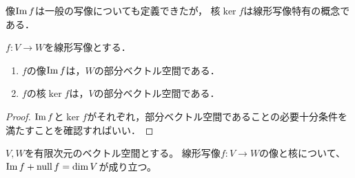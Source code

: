 \documentclass[../sotsu.tex]{subfiles}
\begin{document}
像$\operatorname{Im} f$は一般の写像についても定義できたが，
核$\ker f$は線形写像特有の概念である．



\begin{proposition}
    $f \colon V \to W$を線形写像とする．
    \begin{enumerate}
        \item $f$の像$\operatorname{Im} f$は，$W$の部分ベクトル空間である．
        \item $f$の核$\ker f$は，$V$の部分ベクトル空間である．
    \end{enumerate}
\end{proposition}

\begin{proof}
    $\operatorname{Im} f$と$\ker f$がそれぞれ，部分ベクトル空間であることの必要十分条件を満たすことを確認すればいい．
\end{proof}


\begin{theorem}
    \label{thm:rank-nullity}
    $V, W$を有限次元のベクトル空間とする。
    線形写像$f \colon V \to W$の像と核について、
    $\operatorname{Im} f + \operatorname{null} f = \dim V$が成り立つ\cite[\S 5.1]{miyake-lin-2008}。
\end{theorem}
\end{document}
